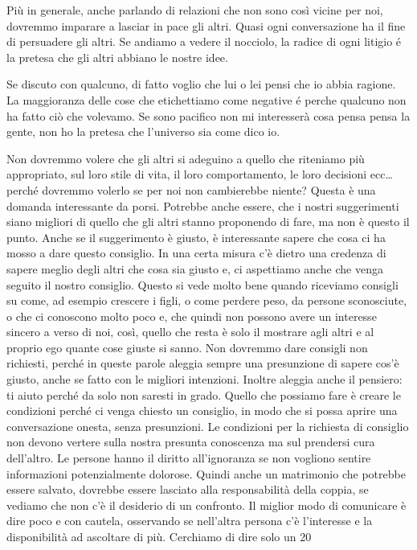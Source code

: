 \documentclass[12pt]{book} %
\begin{document}
\bigskip

Più in generale, anche parlando di relazioni che non sono così vicine per noi, dovremmo imparare a lasciar in pace gli
altri. Quasi ogni conversazione ha il fine di persuadere gli altri. Se andiamo a vedere il nocciolo, la radice di ogni litigio é la pretesa che gli altri abbiano le nostre idee.

Se discuto con qualcuno, di fatto voglio che lui o lei pensi che io abbia ragione.
La maggioranza delle cose che etichettiamo come negative é perche qualcuno non ha fatto ciò che volevamo. Se sono pacifico non mi interesserà cosa pensa pensa la gente, non ho la pretesa che l'universo sia come dico io.

\bigskip
Non dovremmo volere che gli altri si adeguino a quello che
riteniamo più appropriato, sul loro stile di vita, il loro comportamento, le loro decisioni ecc… perché dovremmo
volerlo se per noi non cambierebbe niente? Questa è una domanda interessante da porsi. Potrebbe anche essere, che i
nostri suggerimenti siano migliori di quello che gli altri stanno proponendo di fare, ma non è questo il punto. Anche
se il suggerimento è giusto, è interessante sapere che cosa ci ha mosso a dare questo consiglio. In una certa misura
c'è dietro una credenza di sapere meglio degli altri che cosa sia giusto e, ci aspettiamo anche
che venga seguito il nostro consiglio. Questo si vede molto bene quando riceviamo consigli su come, ad esempio crescere
i figli, o come perdere peso, da persone sconosciute, o che ci conoscono molto poco e, che quindi non possono avere un
interesse sincero a verso di noi, così, quello che resta è solo il mostrare agli altri e al proprio ego quante cose
giuste si sanno. Non dovremmo dare consigli non richiesti, perché in queste parole aleggia sempre una presunzione di
sapere cos'è giusto, anche se fatto con le migliori intenzioni. Inoltre aleggia anche il pensiero:
ti aiuto perché da solo non saresti in grado. Quello che possiamo fare è creare le condizioni perché ci venga chiesto
un consiglio, in modo che si possa aprire una conversazione onesta, senza presunzioni. Le condizioni per la richiesta
di consiglio non devono vertere sulla nostra presunta conoscenza ma sul prendersi cura dell'altro.
Le persone hanno il diritto all'ignoranza se non vogliono sentire informazioni potenzialmente
dolorose. Quindi anche un matrimonio che potrebbe essere salvato, dovrebbe essere lasciato alla responsabilità della
coppia, se vediamo che non c'è il desiderio di un confronto. Il miglior modo di comunicare è dire
poco e con cautela, osservando se nell'altra persona c'è l'interesse e la disponibilità ad ascoltare di più.
Cerchiamo di dire solo un 20%
\end{document}
